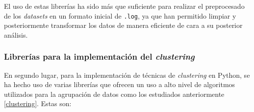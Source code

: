 El uso de estas librerías ha sido más que suficiente para realizar el preprocesado de los \textit{datasets} en un formato inicial de \texttt{.log}, ya que han permitido limpiar y posteriormente transformar los datos de manera eficiente de cara a su posterior análisis.

\subsubsection*{Librerías para la implementación del \textit{clustering}}

En segundo lugar, para la implementación de técnicas de \textit{clustering} en Python, se ha hecho uso de varias librerías que ofrecen un uso a alto nivel de algoritmos utilizados para la agrupación de datos como los estudiados anteriormente \ref{clustering}. Estas son:

